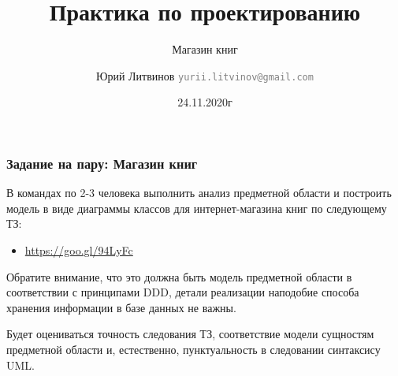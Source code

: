 \documentclass[xetex,mathserif,serif]{beamer}
\title{Практика по проектированию}
\subtitle{Магазин книг}
\author[Юрий Литвинов]{Юрий Литвинов \newline \textcolor{gray}{\small\texttt{yurii.litvinov@gmail.com}}}
\date{24.11.2020г}
\begin{document}
	
	\frame{\titlepage}

	\begin{frame}
		\frametitle{Задание на пару: Магазин книг}
		В командах по 2-3 человека выполнить анализ предметной области и построить модель в виде диаграммы классов для интернет-магазина книг по следующему ТЗ:
		\begin{itemize}
			\item \url{https://goo.gl/94LyFc}
		\end{itemize}

		Обратите внимание, что это должна быть модель предметной области в соответствии с принципами DDD, детали реализации наподобие способа хранения информации в базе данных не важны.

		Будет оцениваться точность следования ТЗ, соответствие модели сущностям предметной области и, естественно, пунктуальность в следовании синтаксису UML.
	\end{frame}
\end{document}
